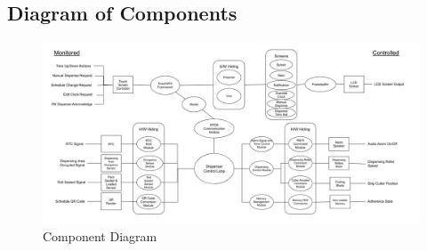 \documentclass[12pt,titlepage]{article}
\begin{document}
\begin{landscape}
\subsection{Diagram of Components}


  \begin{figure}[htbp!]
  \centering
  \includegraphics[width=\linewidth]{ComponentDiagram.jpg}
  \caption{Component Diagram}
\end{figure}


\pagebreak
\end{landscape}
\end{document}
